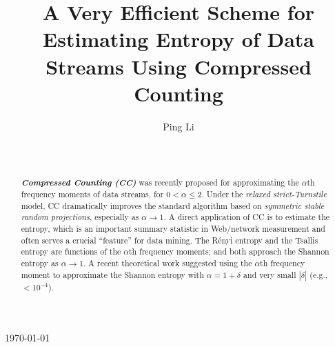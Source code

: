 \documentclass{sig-alternate}
\begin{document}
\title{A Very Efficient Scheme for Estimating Entropy of Data Streams Using Compressed Counting}


\author{
\alignauthor
Ping Li\\
       \\
              \\
}


\maketitle

\noindent \today
\begin{abstract}
\textbf{\em Compressed Counting (CC)} was recently proposed for approximating the $\alpha$th frequency moments of data streams, for $0<\alpha \leq 2$. Under the {\em relaxed strict-Turnstile} model, CC dramatically improves the standard  algorithm based on {\em symmetric stable random projections}, especially as $\alpha\rightarrow 1$.
A direct application of CC is to estimate the entropy, which is an important summary statistic in Web/network measurement and often serves a crucial ``feature'' for data mining.  The R\'enyi entropy and the Tsallis entropy  are functions of the $\alpha$th frequency moments; and both approach the Shannon entropy as $\alpha\rightarrow 1$. A recent theoretical work suggested using the $\alpha$th frequency moment to approximate the Shannon entropy with $\alpha=1+\delta$ and very small $|\delta|$ (e.g., $<10^{-4}$).



\end{abstract}
\end{document}
